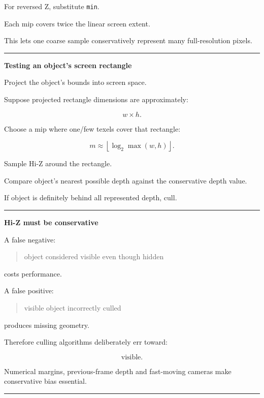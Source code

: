 For reversed Z, substitute \texttt{min}.

Each mip covers twice the linear screen extent.

This lets one coarse sample conservatively represent many full-resolution pixels.

\begin{center}\rule{0.5\linewidth}{0.5pt}\end{center}

\textbf{Testing an object's screen rectangle}

Project the object's bounds into screen space.

Suppose projected rectangle dimensions are approximately:

\[
w\times h.
\]

Choose a mip where one/few texels cover that rectangle:

\[
\boxed{
m
\approx
\left\lfloor
\log_2
\max(w,h)
\right\rfloor.
}
\]

Sample Hi-Z around the rectangle.

Compare object's nearest possible depth against the conservative depth value.

If object is definitely behind all represented depth, cull.

\begin{center}\rule{0.5\linewidth}{0.5pt}\end{center}

\textbf{Hi-Z must be conservative}

A false negative:

\begin{quote}
object considered visible even though hidden
\end{quote}

costs performance.

A false positive:

\begin{quote}
visible object incorrectly culled
\end{quote}

produces missing geometry.

Therefore culling algorithms deliberately err toward:

\[
\boxed{
\text{visible}.
}
\]

Numerical margins, previous-frame depth and fast-moving cameras make conservative bias essential.

\begin{center}\rule{0.5\linewidth}{0.5pt}\end{center}


